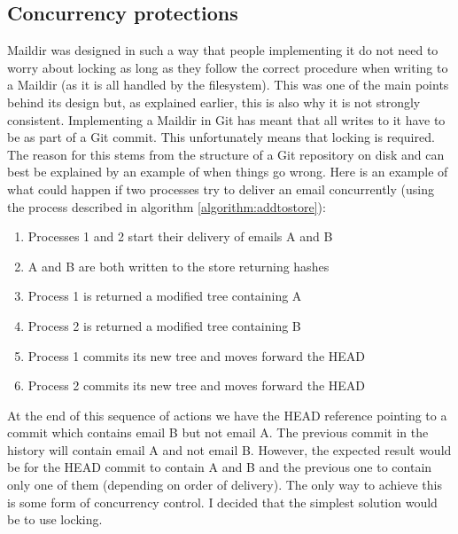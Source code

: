 \subsection{Concurrency protections} \label{section:concurrency}

Maildir was designed in such a way that people implementing it do not need to worry about locking as long as they follow the correct procedure when writing to a Maildir (as it is all handled by the filesystem). This was one of the main points behind its design but, as explained earlier, this is also why it is not strongly consistent. Implementing a Maildir in Git has meant that all writes to it have to be as part of a Git commit. This unfortunately means that locking is required. The reason for this stems from the structure of a Git repository on disk and can best be explained by an example of when things go wrong. Here is an example of what could happen if two processes try to deliver an email concurrently (using the process described in algorithm \ref{algorithm:addtostore}):

\begin{enumerate}[topsep=1pt,itemsep=-1ex,partopsep=1ex,parsep=1ex]
\item Processes 1 and 2 start their delivery of emails A and B
\item A and B are both written to the store returning hashes
\item Process 1 is returned a modified tree containing A
\item Process 2 is returned a modified tree containing B
\item Process 1 commits its new tree and moves forward the HEAD
\item Process 2 commits its new tree and moves forward the HEAD
\end{enumerate}

At the end of this sequence of actions we have the HEAD reference pointing to a commit which contains email B but not email A. The previous commit in the history will contain email A and not email B. However, the expected result would be for the HEAD commit to contain A and B and the previous one to contain only one of them (depending on order of delivery). The only way to achieve this is some form of concurrency control. I decided that the simplest solution would be to use locking.

